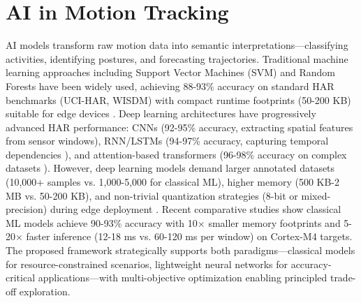 \section{AI in Motion Tracking}
AI models transform raw motion data into semantic interpretations---classifying activities, identifying postures, and forecasting trajectories. Traditional machine learning approaches including Support Vector Machines (SVM) \cite{cortes1995svm} and Random Forests \cite{breiman2001random} have been widely used, achieving 88-93\% accuracy on standard HAR benchmarks (UCI-HAR, WISDM) with compact runtime footprints (50-200 KB) suitable for edge devices \cite{wang2024har_comparative}. Deep learning architectures have progressively advanced HAR performance: CNNs (92-95\% accuracy, extracting spatial features from sensor windows), RNN/LSTMs (94-97\% accuracy, capturing temporal dependencies \cite{xia2020lstm_har}), and attention-based transformers (96-98\% accuracy on complex datasets \cite{singh2023har_transformers}). However, deep learning models demand larger annotated datasets (10,000+ samples vs. 1,000-5,000 for classical ML), higher memory (500 KB-2 MB vs. 50-200 KB), and non-trivial quantization strategies (8-bit or mixed-precision) during edge deployment \cite{lin2022mcunet}. Recent comparative studies \cite{wang2024har_comparative} show classical ML models achieve 90-93\% accuracy with 10$\times$ smaller memory footprints and 5-20$\times$ faster inference (12-18 ms vs. 60-120 ms per window) on Cortex-M4 targets. The proposed framework strategically supports both paradigms---classical models for resource-constrained scenarios, lightweight neural networks for accuracy-critical applications---with multi-objective optimization enabling principled trade-off exploration.


